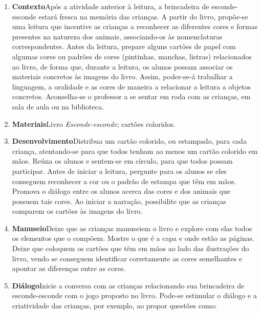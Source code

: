 \documentclass[11pt]{extarticle}
\begin{document}
\begin{enumerate}
\item \textbf{Contexto}\quad Após a atividade anterior à leitura, a brincadeira de esconde-esconde estará fresca na memória das crianças. A partir do livro, propõe-se uma leitura que incentive as crianças a reconhecer as diferentes cores e formas presentes na natureza dos animais, associando-os às nomenclaturas correspondentes. 
Antes da leitura, prepare alguns cartões de papel com algumas cores ou padrões de cores (pintinhas, manchas, listras) relacionados ao livro, de forma que, durante a leitura, os alunos possam associar os materiais concretos às imagens do livro.
Assim, poder-se-á trabalhar a linguagem, a oralidade e as cores de maneira a relacionar a leitura a objetos concretos. 
Aconselha-se o professor a se sentar em roda com as crianças, em sala de aula ou na biblioteca.


\item \textbf{Materiais}\quad Livro \textit{Esconde-esconde}; cartões coloridos.


\item \textbf{Desenvolvimento}\quad Distribua um cartão colorido, ou estampado, para cada criança, atentando-se para que todos tenham ao menos um cartão colorido em mãos. Reúna os alunos e sentem-se em círculo, para que todos possam participar. Antes de iniciar a leitura, pergunte para os alunos se eles conseguem reconhecer a cor ou o padrão de estampa que têm em mãos. Promova o diálogo entre os alunos acerca das cores e dos animais que possuem tais cores. Ao iniciar a narração, possibilite que as crianças comparem os cartões às imagens do livro.

 
\item \textbf{Manuseio}\quad Deixe que as crianças manuseiem o livro 
e explore com elas todos os elementos que o compõem. Mostre o que é a 
capa e onde estão as páginas. Deixe que coloquem os cartões que têm em mãos ao lado das ilustrações do livro, vendo se conseguem identificar corretamente as cores semelhantes e apontar as diferenças entre as cores.

\item \textbf{Diálogo}\quad Inicie a conversa com as crianças relacionando sua brincadeira de esconde-esconde com o jogo proposto no livro. Pode-se estimular o diálogo e a criatividade das crianças, por exemplo, ao propor questões como:


\end{enumerate}
\end{document}

